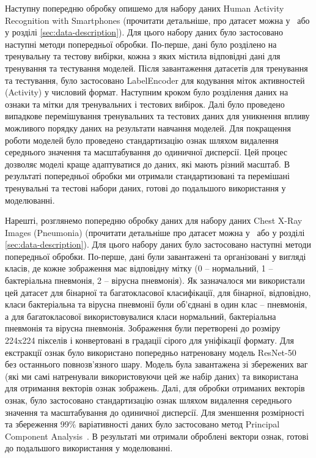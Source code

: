 Наступну попередню обробку опишемо для набору даних Human Activity Recognition with Smartphones (прочитати детальніше, про датасет можна у~\cite{ct31} або у розділі \ref{sec:data-description}). Для цього набору даних було застосовано наступні методи попередньої обробки. По-перше, дані було розділено на тренувальну та тестову вибірки, кожна з яких містила відповідні дані для тренування та тестування моделей. Після завантаження датасетів для тренування та тестування, було застосовано LabelEncoder для кодування міток активностей (Activity) у числовий формат. Наступним кроком було розділення даних на ознаки та мітки для тренувальних і тестових вибірок. Далі було проведено випадкове перемішування тренувальних та тестових даних для уникнення впливу можливого порядку даних на результати навчання моделей. Для покращення роботи моделей було проведено стандартизацію ознак шляхом видалення середнього значення та масштабування до одиничної дисперсії. Цей процес дозволяє моделі краще адаптуватися до даних, які мають різний масштаб. В результаті попередньої обробки ми отримали стандартизовані та перемішані тренувальні та тестові набори даних, готові до подальшого використання у моделюванні. 

Нарешті, розглянемо попередню обробку даних для набору даних Chest X-Ray Images (Pneumonia) (прочитати детальніше про датасет можна у~\cite{ct32} або у розділі \ref{sec:data-description}). Для цього набору даних було застосовано наступні методи попередньої обробки. По-перше, дані були завантажені та організовані у вигляді класів, де кожне зображення має відповідну мітку (0 -- нормальний, 1 -- бактеріальна пневмонія, 2 -- вірусна пневмонія). Як зазначалося ми використали цей датасет для бінарної та багатокласової класифікації, для бінарної, відповідно, класи бактеріальна та вірусна пневмонії були об'єднані в один клас -- пневмонія, а для багатокласової використовувалися класи нормальний, бактеріальна пневмонія та вірусна пневмонія. Зображення були перетворені до розміру 224x224 пікселів і конвертовані в градації сірого для уніфікації формату. Для екстракції ознак було використано попередньо натреновану модель ResNet-50~\cite{ct35} без останнього повнозв'язного шару. Модель була завантажена зі збережених ваг (які ми самі натренували використовуючи цей же набір даних) та використана для отримання векторів ознак зображень. Далі, для обробки отриманих векторів ознак, було застосовано стандартизацію ознак шляхом видалення середнього значення та масштабування до одиничної дисперсії. Для зменшення розмірності та збереження 99$\%$ варіативності даних було застосовано метод Principal Component Analysis~\cite{ct36}. В результаті ми отримали оброблені вектори ознак, готові до подальшого використання у моделюванні.

